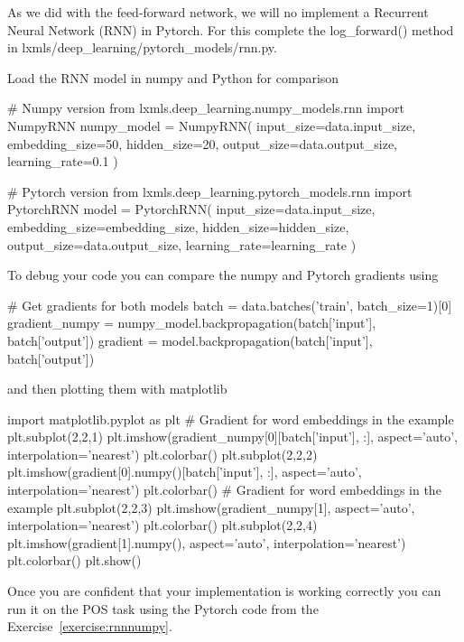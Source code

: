 \begin{exercise}
As we did with the feed-forward network, we will no implement a
Recurrent Neural Network (RNN) in Pytorch. For this complete the
log\_forward() method in lxmls/deep\_learning/pytorch\_models/rnn.py.

\noindent Load the RNN model in numpy and Python for comparison
\begin{python}
# Numpy version
from lxmls.deep_learning.numpy_models.rnn import NumpyRNN
numpy_model = NumpyRNN(
    input_size=data.input_size,
    embedding_size=50,
    hidden_size=20,
    output_size=data.output_size,
    learning_rate=0.1
)

# Pytorch version
from lxmls.deep_learning.pytorch_models.rnn import PytorchRNN
model = PytorchRNN(
    input_size=data.input_size,
    embedding_size=embedding_size,
    hidden_size=hidden_size,
    output_size=data.output_size,
    learning_rate=learning_rate
)
\end{python}
\noindent To debug your code you can compare the numpy and Pytorch gradients using
\begin{python}
# Get gradients for both models
batch = data.batches('train', batch_size=1)[0]
gradient_numpy = numpy_model.backpropagation(batch['input'], batch['output'])
gradient = model.backpropagation(batch['input'], batch['output'])
\end{python}
\noindent and then plotting them with matplotlib
\begin{python}
import matplotlib.pyplot as plt
# Gradient for  word embeddings in the example
plt.subplot(2,2,1)
plt.imshow(gradient_numpy[0][batch['input'], :], aspect='auto', interpolation='nearest')
plt.colorbar()
plt.subplot(2,2,2)
plt.imshow(gradient[0].numpy()[batch['input'], :], aspect='auto', interpolation='nearest')
plt.colorbar()
# Gradient for  word embeddings in the example
plt.subplot(2,2,3)
plt.imshow(gradient_numpy[1], aspect='auto', interpolation='nearest')
plt.colorbar()
plt.subplot(2,2,4)
plt.imshow(gradient[1].numpy(), aspect='auto', interpolation='nearest')
plt.colorbar()
plt.show()
\end{python}
Once you are confident that your implementation is working correctly you can run it on the POS task using the Pytorch code from the Exercise~\ref{exercise:rnnnumpy}. 
\end{exercise}


